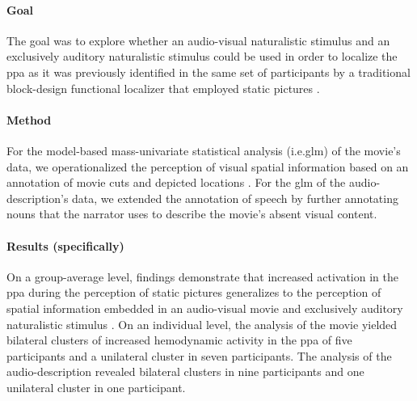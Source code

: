 


\paragraph{Goal}

The goal \citep{haeusler2022processing} was to explore whether an audio-visual
naturalistic stimulus and an exclusively auditory naturalistic stimulus could be
used in order to localize the \ac{ppa} as it was previously identified in the
same set of participants by a traditional block-design functional localizer that
employed static pictures \citep{sengupta2016extension}.

\paragraph{Method}

For the model-based mass-univariate statistical analysis (i.e.\ac{glm}) of the
movie's data, we operationalized the perception of visual spatial information
based on an annotation of movie cuts and depicted locations
\citep{haeusler2016cutanno}.
For the \ac{glm} of the audio-description's data, we extended the annotation of
speech \citep{haeusler2021speechanno} by further annotating nouns that the
narrator uses to describe the movie's absent visual content.


\paragraph{Results (specifically)}


On a group-average level, findings demonstrate that increased activation in the
\ac{ppa} during the perception of static pictures generalizes to the perception
of spatial information embedded in an audio-visual movie and exclusively
auditory naturalistic stimulus \citep{haeusler2022processing}.
On an individual level, the analysis of the movie yielded bilateral
clusters of increased hemodynamic activity in the \ac{ppa} of five participants
and a unilateral cluster in seven participants.
%
The analysis of the audio-description revealed bilateral clusters in nine
participants and one unilateral cluster in one participant.

